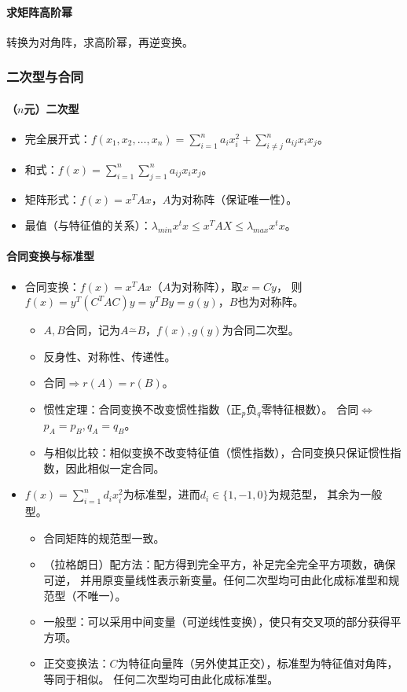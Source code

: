 \documentclass[
12pt, %
a4paper, 
oneside, %
headinclude,footinclude, %
]{scrartcl}
\begin{document}
\paragraph{求矩阵高阶幂}
转换为对角阵，求高阶幂，再逆变换。
\subsubsection[二次型与合同]{二次型与合同}
\paragraph{（$ n $元）二次型}
\begin{itemize}
\item 完全展开式：$ f(x_1, x_2, \dots, x_n) = \sum_{i = 1}^n a_ix_i^2 + \sum_{i \neq j}^n a_{ij}x_ix_j $。
\item 和式：$ f(x) = \sum_{i = 1}^n\sum_{j = 1}^n a_{ij}x_ix_j $。
\item 矩阵形式：$ f(x) = x^TAx $，$ A $为对称阵（保证唯一性）。
\item 最值（与特征值的关系）：$ \lambda_{min}x^tx \leq x^TAX \leq \lambda_{max}x^tx $。
\end{itemize}
\paragraph{合同变换与标准型}
\begin{itemize}
\item 合同变换：$ f(x) = x^TAx $（$ A $为对称阵），取$ x = Cy $，
则$ f(x) = y^T(C^TAC)y = y^TBy = g(y) $，$ B $也为对称阵。
\begin{itemize}
\item $ A,B $合同，记为$ A \overset{\sim}{-} B $，$ f(x),g(y) $为合同二次型。
\item 反身性、对称性、传递性。
\item 合同$ \Rightarrow $$ r(A) = r(B) $。
\item 惯性定理：合同变换不改变惯性指数（正$ _p $负$ _q $零特征根数）。
合同$ \Leftrightarrow $$ p_A = p_B, q_A = q_B $。
\item 与相似比较：相似变换不改变特征值（惯性指数），合同变换只保证惯性指数，因此相似一定合同。
\end{itemize}
\item $ f(x) = \sum_{i = 1}^n d_ix_i^2 $为标准型，进而$ d_i \in \{1, -1, 0\} $为规范型，
其余为一般型。
\begin{itemize}
\item 合同矩阵的规范型一致。
\item （拉格朗日）配方法：配方得到完全平方，补足完全完全平方项数，确保可逆，
并用原变量线性表示新变量。任何二次型均可由此化成标准型和规范型（不唯一）。
\item 一般型：可以采用中间变量（可逆线性变换），使只有交叉项的部分获得平方项。
\item 正交变换法：$ C $为特征向量阵（另外使其正交），标准型为特征值对角阵，等同于相似。
任何二次型均可由此化成标准型。
\end{itemize}
\end{itemize}
\end{document}
